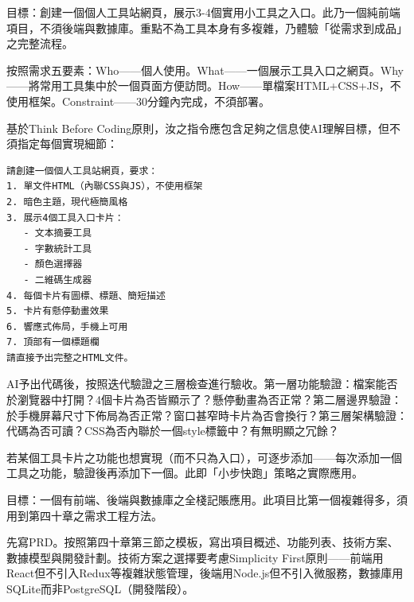 



目標：創建一個個人工具站網頁，展示3-4個實用小工具之入口。此乃一個純前端項目，不須後端與數據庫。重點不為工具本身有多複雜，乃體驗「從需求到成品」之完整流程。

按照需求五要素：Who——個人使用。What——一個展示工具入口之網頁。Why——將常用工具集中於一個頁面方便訪問。How——單檔案HTML+CSS+JS，不使用框架。Constraint——30分鐘內完成，不須部署。


基於Think Before Coding原則，汝之指令應包含足夠之信息使AI理解目標，但不須指定每個實現細節：

\begin{lstlisting}
請創建一個個人工具站網頁，要求：
1. 單文件HTML（內聯CSS與JS），不使用框架
2. 暗色主題，現代極簡風格
3. 展示4個工具入口卡片：
   - 文本摘要工具
   - 字數統計工具
   - 顏色選擇器
   - 二維碼生成器
4. 每個卡片有圖標、標題、簡短描述
5. 卡片有懸停動畫效果
6. 響應式佈局，手機上可用
7. 頂部有一個標題欄
請直接予出完整之HTML文件。
\end{lstlisting}


AI予出代碼後，按照迭代驗證之三層檢查進行驗收。第一層功能驗證：檔案能否於瀏覽器中打開？4個卡片為否皆顯示了？懸停動畫為否正常？第二層邊界驗證：於手機屏幕尺寸下佈局為否正常？窗口甚窄時卡片為否會換行？第三層架構驗證：代碼為否可讀？CSS為否內聯於一個style標籤中？有無明顯之冗餘？

若某個工具卡片之功能也想實現（而不只為入口），可逐步添加——每次添加一個工具之功能，驗證後再添加下一個。此即「小步快跑」策略之實際應用。



目標：一個有前端、後端與數據庫之全棧記賬應用。此項目比第一個複雜得多，須用到第四十章之需求工程方法。

先寫PRD。按照第四十章第三節之模板，寫出項目概述、功能列表、技術方案、數據模型與開發計劃。技術方案之選擇要考慮Simplicity First原則——前端用React但不引入Redux等複雜狀態管理，後端用Node.js但不引入微服務，數據庫用SQLite而非PostgreSQL（開發階段）。

